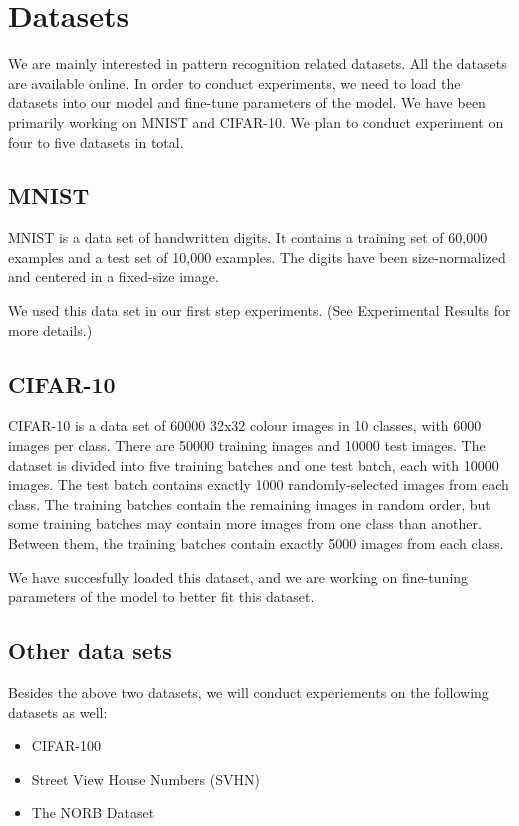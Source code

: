 \section{Datasets}
\label{sec:meth}


We are mainly interested in pattern recognition related datasets.
All the datasets are available online.
In order to conduct experiments, we need to load the datasets into our
model and fine-tune parameters of the model.
We have been primarily working on MNIST and CIFAR-10. We plan to
conduct experiment on four to five datasets in total.

\subsection{MNIST}
MNIST is a data set of handwritten digits. It contains a training set of
60,000 examples and a test set of 10,000 examples. The digits have been
size-normalized and centered in a fixed-size image.

We used this data set in our first step experiments. (See Experimental
Results for more details.)

\subsection{CIFAR-10}
CIFAR-10 is a data set of 60000 32x32 colour images in 10 classes, with
6000 images per class. There are 50000 training images and 10000 test
images. The dataset is divided into five training batches and one test
batch, each with 10000 images. The test batch contains exactly 1000
randomly-selected images from each class. The training batches contain the
remaining images in random order, but some training batches may contain
more images from one class than another. Between them, the training
batches contain exactly 5000 images from each class.

We have succesfully loaded this dataset, and we are working on
fine-tuning parameters of the model to better fit this dataset.

\subsection{Other data sets}
Besides the above two datasets, we will conduct experiements on the
following datasets as well:
\begin{itemize}
\vspace{-7pt}
\item CIFAR-100 \\
\vspace{-7pt}
\item Street View House Numbers (SVHN)\\
\vspace{-7pt}
\item The NORB Dataset
\end{itemize}

